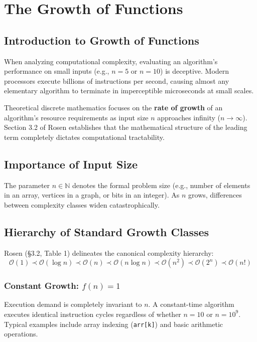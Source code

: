 \chapter{The Growth of Functions}
\label{chap:growth}

\section{Introduction to Growth of Functions}
When analyzing computational complexity, evaluating an algorithm's performance on small inputs (e.g., $n = 5$ or $n = 10$) is deceptive. Modern processors execute billions of instructions per second, causing almost any elementary algorithm to terminate in imperceptible microseconds at small scales. 

Theoretical discrete mathematics focuses on the \textbf{rate of growth} of an algorithm's resource requirements as input size $n$ approaches infinity ($n \to \infty$). Section 3.2 of Rosen \cite{rosen2019discrete} establishes that the mathematical structure of the leading term completely dictates computational tractability.

\section{Importance of Input Size}
The parameter $n \in \mathbb{N}$ denotes the formal problem size (e.g., number of elements in an array, vertices in a graph, or bits in an integer). As $n$ grows, differences between complexity classes widen catastrophically.

\section{Hierarchy of Standard Growth Classes}
Rosen (§3.2, Table 1) \cite{rosen2019discrete} delineates the canonical complexity hierarchy:
\begin{equation}
\mathcal{O}(1) \prec \mathcal{O}(\log n) \prec \mathcal{O}(n) \prec \mathcal{O}(n \log n) \prec \mathcal{O}(n^2) \prec \mathcal{O}(2^n) \prec \mathcal{O}(n!)
\label{eq:hierarchy}
\end{equation}

\subsection{Constant Growth: $f(n) = 1$}
Execution demand is completely invariant to $n$. A constant-time algorithm executes identical instruction cycles regardless of whether $n = 10$ or $n = 10^9$. Typical examples include array indexing (\texttt{arr[k]}) and basic arithmetic operations.

